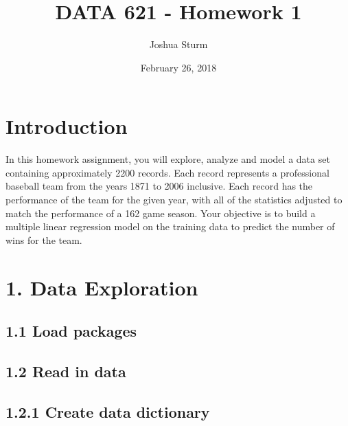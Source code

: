 \documentclass[]{article}
\title{DATA 621 - Homework 1}
\author{Joshua Sturm}
\date{February 26, 2018}
\begin{document}
\maketitle

\section{Introduction}\label{introduction}

In this homework assignment, you will explore, analyze and model a data
set containing approximately 2200 records. Each record represents a
professional baseball team from the years 1871 to 2006 inclusive. Each
record has the performance of the team for the given year, with all of
the statistics adjusted to match the performance of a 162 game season.
Your objective is to build a multiple linear regression model on the
training data to predict the number of wins for the team.

\section{1. Data Exploration}\label{data-exploration}

\subsection{1.1 Load packages}\label{load-packages}

\subsection{1.2 Read in data}\label{read-in-data}

\subsection{1.2.1 Create data dictionary}\label{create-data-dictionary}
\end{document}
